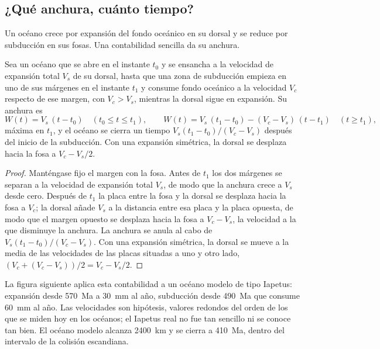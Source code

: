 \subsection{¿Qué anchura, cuánto tiempo?}

Un océano crece por expansión del fondo oceánico en su dorsal y se reduce por subducción en sus fosas.
Una contabilidad sencilla da su anchura.

\begin{proposition}\label{prop:b2:wilson-cycle:width}
Sea un océano que se abre en el instante $t_0$ y se ensancha a la velocidad de expansión total $V_s$ de su dorsal, hasta que
una zona de subducción empieza en uno de sus márgenes en el instante $t_1$ y consume fondo oceánico a la velocidad $V_c$
respecto de ese margen, con $V_c > V_s$, mientras la dorsal sigue en expansión. Su anchura es
\[
  W(t) = V_s\,(t - t_0) \quad (t_0 \le t \le t_1), \qquad
  W(t) = V_s\,(t_1 - t_0) - (V_c - V_s)\,(t - t_1) \quad (t \ge t_1),
\]
máxima en $t_1$, y el océano se cierra un tiempo $V_s(t_1 - t_0)/(V_c - V_s)$ después del inicio de la
subducción. Con una expansión simétrica, la dorsal se desplaza hacia la fosa a $V_c - V_s/2$.
\end{proposition}

\begin{proof}
Manténgase fijo el margen con la fosa. Antes de $t_1$ los dos márgenes se separan a la velocidad de expansión
total $V_s$, de modo que la anchura crece a $V_s$ desde cero. Después de $t_1$ la placa entre la
fosa y la dorsal se desplaza hacia la fosa a $V_c$; la dorsal añade $V_s$ a la distancia
entre esa placa y la placa opuesta, de modo que el margen opuesto se desplaza hacia la fosa a $V_c - V_s$,
la velocidad a la que disminuye la anchura. La anchura se anula al cabo de $V_s(t_1 - t_0)/(V_c -
V_s)$. Con una expansión simétrica, la dorsal se mueve a la media de las velocidades de las placas situadas a
uno y otro lado, $(V_c + (V_c - V_s))/2 = V_c - V_s/2$.
\end{proof}

La figura siguiente aplica esta contabilidad a un océano modelo de tipo Iapetus: expansión desde
\qty{570}{Ma} a \qty{30}{mm} al año, subducción desde \qty{490}{Ma} que consume \qty{60}{mm} al
año. Las velocidades son hipótesis, valores redondos del orden de los que se miden hoy en los océanos; el
Iapetus real no fue tan sencillo ni se conoce tan bien. El océano modelo alcanza \qty{2400}{km}
y se cierra a \qty{410}{Ma}, dentro del intervalo de la colisión escandiana.

